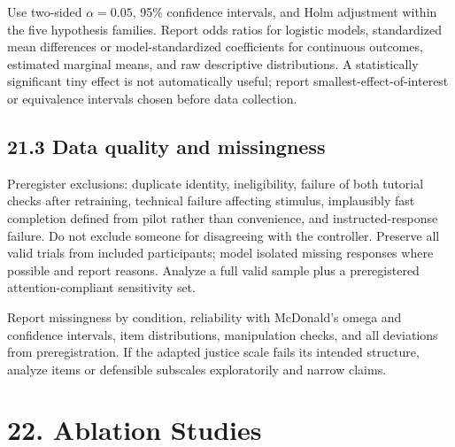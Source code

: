 \documentclass[
  english,
  11pt,
  a4paper,
]{article}
\begin{document}
Use two-sided \(\alpha=0.05\), 95\% confidence intervals, and Holm adjustment
within the five hypothesis families. Report odds ratios for logistic
models, standardized mean differences or model-standardized coefficients
for continuous outcomes, estimated marginal means, and raw descriptive
distributions. A statistically significant tiny effect is not
automatically useful; report smallest-effect-of-interest or equivalence
intervals chosen before data collection.

\subsection{21.3 Data quality and
missingness}\label{data-quality-and-missingness}

Preregister exclusions: duplicate identity, ineligibility, failure of
both tutorial checks after retraining, technical failure affecting
stimulus, implausibly fast completion defined from pilot rather than
convenience, and instructed-response failure. Do not exclude someone for
disagreeing with the controller. Preserve all valid trials from included
participants; model isolated missing responses where possible and report
reasons. Analyze a full valid sample plus a preregistered
attention-compliant sensitivity set.

Report missingness by condition, reliability with McDonald's omega and
confidence intervals, item distributions, manipulation checks, and all
deviations from preregistration. If the adapted justice scale fails its
intended structure, analyze items or defensible subscales exploratorily
and narrow claims.

\section{22. Ablation Studies}\label{ablation-studies}
\end{document}
